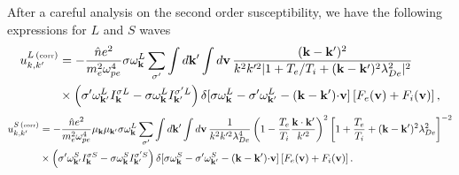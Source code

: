 \documentclass[12pt,a4paper,ruledheader]{report}
\begin{document}
After a careful analysis on the second order susceptibility, we have
the following expressions for $L$ and $S$ waves
\begin{equation}
  \begin{split}
    u_{k,k'}^{L\, (\mbox{\tiny corr})}
    &= - \frac{\hat n e^2}{m_e^2\omega_{pe}^4}\sigma \omega_{\bf k}^L
    \sum_{\sigma '}  \int d{\bf k'}\int d{\bf v}\,
       \frac{({\bf k-k'})^2}{k^2 k'^2|1+T_e/T_i+({\bf k-k'})^2 \lambda_{De}^2|^2}\\
    &\times  \left( \sigma '\omega_{\bf k'}^L I_{\bf k}^{\sigma L}
      -\sigma \omega_{\bf k}^L I_{\bf k'}^{\sigma 'L}\right) 
    \delta[\sigma\omega_{\bf k}^L-\sigma '\omega_{\bf k'}^L
    -({\bf k-k'}){\bf \cdot v}]\left[ F_e({\bf v}) +F_i({\bf v})\right],
  \end{split}
\end{equation}
\begin{equation}
  \begin{split}
    u_{k,k'}^{S\, (\mbox{\tiny corr})}
    &= - \frac{\hat n e^2}{m_e^2\omega_{pe}^4}\mu_{\bf k}\mu_{\bf k'}
    \sigma \omega_{\bf k}^L \sum_{\sigma '}  \int d{\bf k'}\int d{\bf v}\,
    \frac{1}{k^2 k'^2\lambda_{De}^4}
    \left(1-\frac{T_e}{T_i} \frac{\bf k \cdot k'}{k'^2} \right)^2
    \left[1+\frac{T_e}{T_i}+({\bf k-k'})^2 \lambda_{De}^2\right]^{-2}\\
    &\times  \left( \sigma '\omega_{\bf k'}^S I_{\bf k}^{\sigma S}
      -\sigma \omega_{\bf k}^S I_{\bf k'}^{\sigma 'S}\right) 
    \delta[\sigma\omega_{\bf k}^S-\sigma '\omega_{\bf k'}^S
    -({\bf k-k'}){\bf \cdot v}]\left[ F_e({\bf v}) +F_i({\bf v})\right].
  \end{split}
\end{equation}
\end{document}
